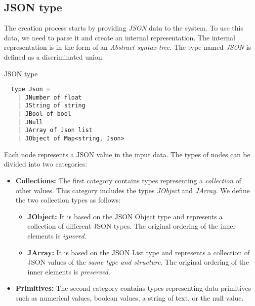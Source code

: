 \subsection{JSON type}
\label{sub:json}
The creation process starts by providing \emph{JSON} data to the system.
To use this data, we need to parse it and create an internal representation.
The internal representation is in the form of an \emph{Abstract syntax tree}.
The type named \emph{JSON} is defined as a discriminated union.
\begin{listing}[H]
	\caption {JSON type}
	\begin{lstlisting}
  type Json =
    | JNumber of float
    | JString of string
    | JBool of bool
    | JNull
    | JArray of Json list
    | JObject of Map<string, Json>
  \end{lstlisting}
\end{listing}

Each node represents a JSON value in the input data.
The types of nodes can be divided into two categories:
\begin{itemize}
	\item {\textbf{Collections:} The first category contains types representing a \emph{collection} of other values. This category includes the types \emph{JObject} and \emph{JArray}.
	      We define the two collection types as follows:
	      \begin{itemize}
		      \item \textbf{JObject:} It is based on the JSON Object type and represents a collection of different JSON types. The original ordering of the inner elements is \emph{ignored}.
		      \item \textbf{JArray:} It is based on the JSON List type and represents a collection of JSON values of the \emph{same type and structure}. The original ordering of the inner elements is \emph{preserved}.
	      \end{itemize}
	      }
	\item \textbf{Primitives:} The second category contains types representing data primitives such as numerical values, boolean values,
	      a string of text, or the null value.
\end{itemize}

